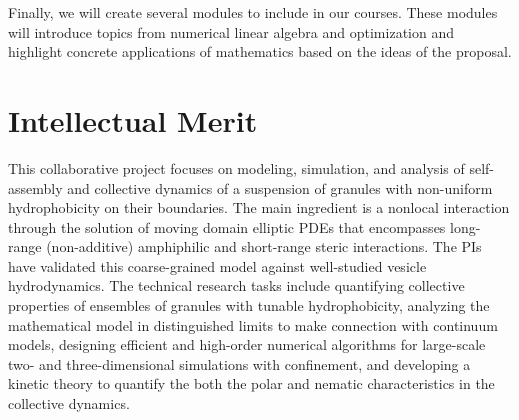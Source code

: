 Finally, we will
create several modules to include in our courses. These modules will
introduce topics from numerical linear algebra and optimization and
highlight concrete applications of mathematics based on the ideas of the
proposal.

\section{Intellectual Merit}
\label{sec:IntellectualMerit}
This collaborative project focuses on modeling, simulation, and analysis
of self-assembly and collective dynamics of a suspension of granules with 
non-uniform hydrophobicity on their boundaries. The main
ingredient is a nonlocal interaction through the solution of moving
domain elliptic PDEs that encompasses long-range (non-additive) amphiphilic and
short-range steric interactions. The PIs have validated this
coarse-grained model against well-studied vesicle hydrodynamics. The
technical research tasks include quantifying collective properties of
ensembles of granules with tunable hydrophobicity, analyzing the mathematical model in 
distinguished limits to make connection with continuum models,
designing efficient and
high-order numerical algorithms for large-scale two- and
three-dimensional simulations with confinement, and developing a kinetic
theory to quantify the both the polar and nematic characteristics in the collective dynamics.
%

